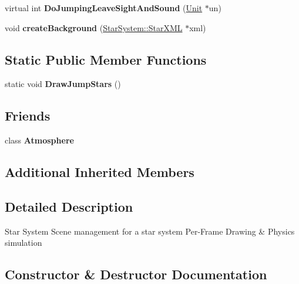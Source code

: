 \begin{DoxyCompactItemize}
\item 
virtual int {\bfseries Do\+Jumping\+Leave\+Sight\+And\+Sound} (\hyperlink{classUnit}{Unit} $\ast$un)\hypertarget{classGameStarSystem_a457fdf7d22f9d280d60f859ea6af8048}{}\label{classGameStarSystem_a457fdf7d22f9d280d60f859ea6af8048}

\item 
void {\bfseries create\+Background} (\hyperlink{structStarSystem_1_1StarXML}{Star\+System\+::\+Star\+X\+ML} $\ast$xml)\hypertarget{classGameStarSystem_a34b679f959826666fb9eb88f866f2df3}{}\label{classGameStarSystem_a34b679f959826666fb9eb88f866f2df3}

\end{DoxyCompactItemize}
\subsection*{Static Public Member Functions}
\begin{DoxyCompactItemize}
\item 
static void {\bfseries Draw\+Jump\+Stars} ()\hypertarget{classGameStarSystem_a586aca838f6dec84ddaa494b889d919a}{}\label{classGameStarSystem_a586aca838f6dec84ddaa494b889d919a}

\end{DoxyCompactItemize}
\subsection*{Friends}
\begin{DoxyCompactItemize}
\item 
class {\bfseries Atmosphere}\hypertarget{classGameStarSystem_acc7b8176b47162079049510bd09627ae}{}\label{classGameStarSystem_acc7b8176b47162079049510bd09627ae}

\end{DoxyCompactItemize}
\subsection*{Additional Inherited Members}


\subsection{Detailed Description}
Star System Scene management for a star system Per-\/\+Frame Drawing \& Physics simulation 

\subsection{Constructor \& Destructor Documentation}
